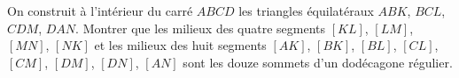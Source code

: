 On construit à l'intérieur du carré $ABCD$ les triangles équilatéraux $ABK$, $BCL$, $CDM$, $DAN$. Montrer que les milieux des quatre segments $[KL]$, $[LM]$, $[MN]$, $[NK]$ et les milieux des huit segments $[AK]$, $[BK]$, $[BL]$, $[CL]$, $[CM]$, $[DM]$, $[DN]$, $[AN]$ sont les douze sommets d'un dodécagone régulier.
